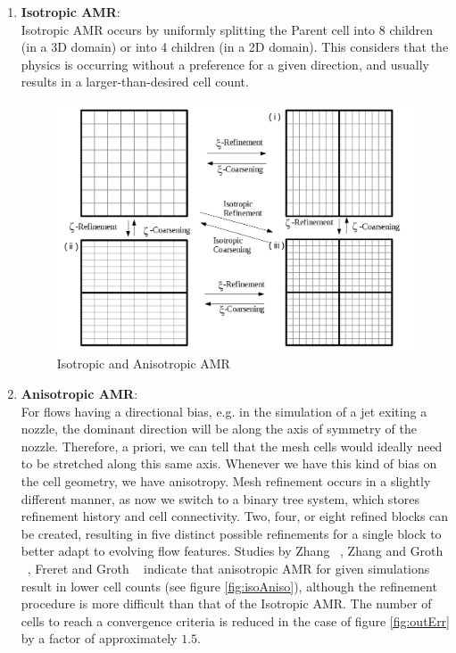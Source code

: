 \begin{enumerate}

\item \textbf{Isotropic AMR}:\\
Isotropic AMR  occurs by uniformly splitting the Parent cell into 8 children (in a 3D domain) or into 4 children (in a 2D domain). This considers that the physics is occurring without a preference for a given direction, and usually results in a larger-than-desired cell count.

\begin{figure}
    \vspace{0.2cm}
    \begin{center}
      \includegraphics[height=0.35\textwidth]{./figs/BlockDivision.jpg}
    \end{center}
    \caption{Isotropic and Anisotropic AMR \cite{zhang:2011a}}  
    \vspace{0.2cm}
\end{figure}

\item \textbf{Anisotropic AMR}: \\
For flows having a directional bias, e.g. in the simulation of a jet exiting a nozzle, the dominant direction will be along the axis of symmetry of the nozzle. Therefore, a priori, we can tell that the mesh cells would ideally need to be stretched along this same axis. Whenever we have this kind of bias on the cell geometry, we have anisotropy. Mesh refinement occurs in a slightly different manner, as now we switch to a binary tree system, which stores refinement history and cell connectivity. Two, four, or eight refined blocks can be created, resulting in five distinct possible refinements for a single block to better adapt to evolving flow features. Studies by Zhang ~\cite{zhang:2011a}, Zhang and Groth ~\cite{zhang:2011b}, Freret and Groth ~\cite{Freret:2015} indicate that anisotropic AMR for given simulations result in lower cell counts (see figure \ref{fig:isoAniso}), although the refinement procedure is more difficult than that of the Isotropic AMR. The number of cells to reach a convergence criteria is reduced in the case of figure \ref{fig:outErr} by a factor of approximately $1.5$.  \par


\end{enumerate}
